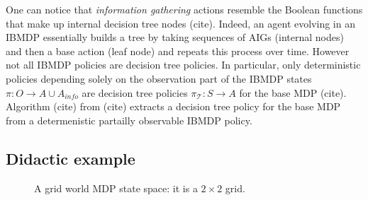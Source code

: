 One can notice that \textit{information gathering} actions resemble the Boolean functions that make up internal decision tree nodes (cite). 
Indeed, an agent evolving in an IBMDP essentially builds a tree by taking sequences of AIGs (internal nodes) and then a base action (leaf node) and repeats this process over time.
However not all IBMDP policies are decision tree policies. In particular, only deterministic policies depending solely on the observation part of the IBMDP states $\pi: O \rightarrow A\cup A_{info}$ are decision tree policies $\pi_{\mathcal{T}}: S \rightarrow A$ for the base MDP (cite).
Algorithm (cite) from (cite) extracts a decision tree policy for the base MDP from a determenistic partailly observable IBMDP policy.

\subsection{Didactic example}
\begin{figure}[h]
\centering
{}
\caption{A grid world MDP state space: it is a $2\times2$ grid.}
\end{figure}

